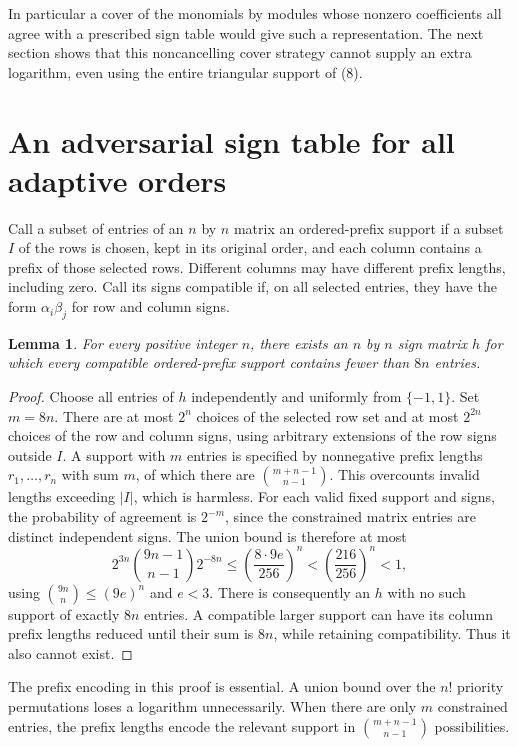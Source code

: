 \documentclass[11pt]{article}
\newtheorem{lemma}[theorem]{Lemma}
\begin{document}
In particular a cover of the monomials by modules whose nonzero
coefficients all agree with a prescribed sign table would give
such a representation. The next section shows that this
noncancelling cover strategy cannot supply an extra logarithm,
even using the entire triangular support of (8).

\section{An adversarial sign table for all adaptive orders}

Call a subset of entries of an $n$ by $n$ matrix an ordered-prefix
support if a subset $I$ of the rows is chosen, kept in its original
order, and each column contains a prefix of those selected rows.
Different columns may have different prefix lengths, including zero.
Call its signs compatible if, on all selected entries, they have
the form $\alpha_i\beta_j$ for row and column signs.

\begin{lemma}\label{lem:random}
For every positive integer $n$, there exists an $n$ by $n$ sign
matrix $h$ for which every compatible ordered-prefix support
contains fewer than $8n$ entries.
\end{lemma}

\begin{proof}
Choose all entries of $h$ independently and uniformly from
$\{-1,1\}$. Set $m=8n$. There are at most $2^n$ choices of the
selected row set and at most $2^{2n}$ choices of the row and column
signs, using arbitrary extensions of the row signs outside $I$.
A support with $m$ entries is specified by nonnegative prefix
lengths $r_1,\ldots,r_n$ with sum $m$, of which there are
$\binom{m+n-1}{n-1}$. This overcounts invalid lengths exceeding
$|I|$, which is harmless. For each valid fixed support and signs,
the probability of agreement is $2^{-m}$, since the constrained
matrix entries are distinct independent signs. The union bound
is therefore at most
\[
 2^{3n}\binom{9n-1}{n-1}2^{-8n}
 \le \left(\frac{8\cdot9e}{256}\right)^n
 < \left(\frac{216}{256}\right)^n <1,             \tag{9}
\]
using $\binom{9n}{n}\le(9e)^n$ and $e<3$.
There is consequently an $h$ with no such support of exactly $8n$
entries. A compatible larger support can have its column prefix
lengths reduced until their sum is $8n$, while retaining
compatibility. Thus it also cannot exist.
\end{proof}

The prefix encoding in this proof is essential. A union bound
over the $n!$ priority permutations loses a logarithm unnecessarily.
When there are only $m$ constrained entries, the prefix lengths
encode the relevant support in $\binom{m+n-1}{n-1}$ possibilities.
\end{document}
